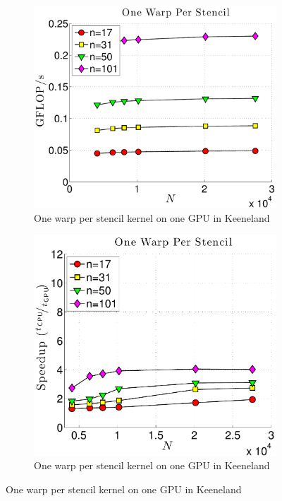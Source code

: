 \begin{figure}
\begin{subfigure}[t]{0.425\textwidth}
\includegraphics[width=1.0\textwidth]{../figures/keeneland_results/alltoallv/gflops_gpu_1proc_oneWarpPerStencil-eps-converted-to.pdf}
\caption{One warp per stencil kernel on one GPU in Keeneland}
\label{fig:gflops_gpu_1proc_oneWarp_keeneland}
\end{subfigure} 
\begin{subfigure}[t]{0.425\textwidth}
\includegraphics[width=1.0\textwidth]{../figures/keeneland_results/alltoallv/speedup_1proc_oneWarpPerStencil-eps-converted-to.pdf}
\caption{One warp per stencil kernel on one GPU in Keeneland}
\label{fig:speedup_1proc_oneWarp_keeneland}
\end{subfigure} 


\end{figure}

